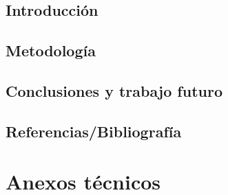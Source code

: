 \documentclass{book}
\begin{document}
	\chapter{Introducción}
	
	
	
	
	\chapter{Metodología}
	
	
	
	
	

	\chapter{Conclusiones y trabajo futuro}
	
	
	\chapter{Referencias/Bibliografía}
	
	
	\part{Anexos técnicos}
	\appendix
	
	
	
	
\end{document}
